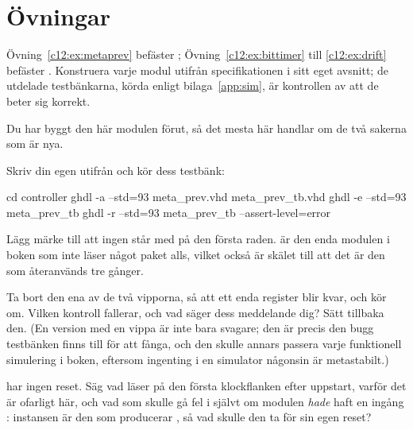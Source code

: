
\section{Övningar}
\label{c12:sec:exercises}

\begin{aside}
Övning~\ref{c12:ex:metaprev} befäster ; Övning~\ref{c12:ex:bittimer} till
\ref{c12:ex:drift} befäster . Konstruera varje modul utifrån
specifikationen i sitt eget avsnitt; de utdelade testbänkarna, körda enligt bilaga~\ref{app:sim}, är
kontrollen av att de beter sig korrekt.
\end{aside}


\label{c12:ex:metaprev}
Du har byggt den här modulen förut, så det mesta här handlar om de två sakerna som är nya.

 Skriv din egen  utifrån  och kör dess
testbänk:

\begin{shell}
cd controller
ghdl -a --std=93 meta_prev.vhd meta_prev_tb.vhd
ghdl -e --std=93 meta_prev_tb
ghdl -r --std=93 meta_prev_tb --assert-level=error
\end{shell}

Lägg märke till att ingen  står med på den första raden.  är den
enda modulen i boken som inte läser något paket alls, vilket också är skälet till att det är den som
återanvänds tre gånger.

 Ta bort den ena av de två vipporna, så att ett enda register blir kvar, och kör om. Vilken
kontroll fallerar, och vad säger dess meddelande dig? Sätt tillbaka den. (En version med en vippa är
inte bara svagare; den är precis den bugg testbänken finns till för att fånga, och den skulle annars
passera varje funktionell simulering i boken, eftersom ingenting i en simulator någonsin är
metastabilt.)

  har ingen reset. Säg vad  läser på den första klockflanken
efter uppstart, varför det är ofarligt här, och vad som skulle gå fel i  självt
om modulen \emph{hade} haft en ingång : instansen  är den som
producerar , så vad skulle den ta för sin egen reset?

